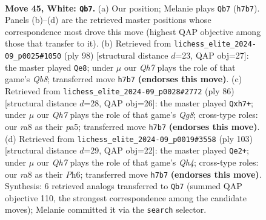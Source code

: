 \documentclass[11pt]{article}
\begin{document}
\clearpage

\begin{figure}[p]\centering
\begin{subfigure}{0.46\textwidth}\centering
\resizebox{\linewidth}{!}{%
\newchessgame
\chessboard[
  setfen={r7/7Q/4kp2/3p4/3q1P2/p5P1/P5KP/8 w - - 9 45},
  showmover=false,
  pgfstyle=straightmove, color=movearrow, markmove={h7-b7}
]}
\caption{}
\end{subfigure}\hfill
\begin{subfigure}{0.46\textwidth}\centering
\resizebox{\linewidth}{!}{%
\newchessgame
\chessboard[
  setfen={1Q6/6pk/8/5p2/4p3/1pq1P1P1/5PK1/8 w - - 4 50},
  showmover=false,
  pgfstyle=straightmove, color=movearrow, markmove={b8-e8}
]}
\caption{}
\end{subfigure}
\\[4pt]
\begin{subfigure}{0.46\textwidth}\centering
\resizebox{\linewidth}{!}{%
\newchessgame
\chessboard[
  setfen={6Q1/7p/5p2/p4k2/4p3/PP2q1P1/3p3P/7K w - - 2 44},
  showmover=false,
  pgfstyle=straightmove, color=movearrow, markmove={g8-h7}
]}
\caption{}
\end{subfigure}\hfill
\begin{subfigure}{0.46\textwidth}\centering
\resizebox{\linewidth}{!}{%
\newchessgame
\chessboard[
  setfen={8/1P4pk/2Q1p2p/p3Pp1q/P7/6P1/6K1/8 b - - 1 52},
  showmover=false,
  pgfstyle=straightmove, color=movearrow, markmove={h5-e2}
]}
\caption{}
\end{subfigure}
\caption{\textbf{Move 45, White: \texttt{Qb7}.} (a) Our position; Melanie plays \texttt{Qb7} (\texttt{h7b7}). Panels (b)--(d) are the retrieved master positions whose correspondence most drove this move (highest QAP objective among those that transfer to it). (b) Retrieved from \texttt{lichess\_elite\_2024-09\_p0025\#1050} (ply 98) [structural distance $d$=23, QAP obj=27]: the master played \texttt{Qe8}; under $\mu$ our \emph{Qh7} plays the role of that game's \emph{Qb8}; transferred move \texttt{h7b7} \textbf{(endorses this move)}. (c) Retrieved from \texttt{lichess\_elite\_2024-09\_p0028\#2772} (ply 86) [structural distance $d$=28, QAP obj=26]: the master played \texttt{Qxh7+}; under $\mu$ our \emph{Qh7} plays the role of that game's \emph{Qg8}; cross-type roles: our \emph{r}a8 as their \emph{p}a5; transferred move \texttt{h7b7} \textbf{(endorses this move)}. (d) Retrieved from \texttt{lichess\_elite\_2024-09\_p0019\#3558} (ply 103) [structural distance $d$=29, QAP obj=22]: the master played \texttt{Qe2+}; under $\mu$ our \emph{Qh7} plays the role of that game's \emph{Qh4}; cross-type roles: our \emph{r}a8 as their \emph{P}h6; transferred move \texttt{h7b7} \textbf{(endorses this move)}. Synthesis: 6 retrieved analogs transferred to \texttt{Qb7} (summed QAP objective 110, the strongest correspondence among the candidate moves); Melanie committed it via the \texttt{search} selector.}
\label{fig:thought-m88}
\end{figure}
\end{document}
